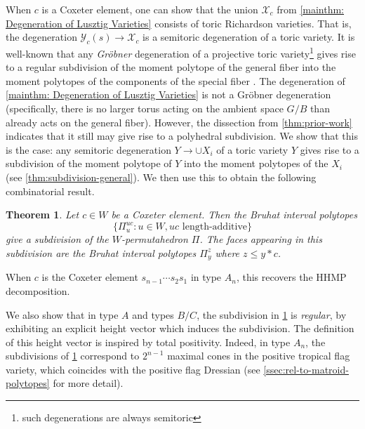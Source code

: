 \documentclass[11pt]{amsart}
\newtheorem{mainthm}{Theorem}
\theoremstyle{definition}
\def\calX{\mathcal{X}}
\newcommand\calY{{\mathcal Y}}
\begin{document}
When $c$ is a Coxeter element, one can show that the union $\calX_c$
from \cref{mainthm: Degeneration of Lusztig Varieties} consists of
toric Richardson varieties. That is, the degeneration
$\calY_c(s) \to \calX_c$ is a semitoric degeneration of a toric
variety. It is well-known that any \emph{Gr\"obner} degeneration of a
projective toric
variety\footnote{such degenerations are always semitoric} gives rise to a
regular subdivision of the moment polytope of the general fiber into
the moment polytopes of the components of the special fiber
\cite{sturmfels1991grobner,zhu2012degenerations}. 
The degeneration of \cref{mainthm: Degeneration of Lusztig Varieties} is
not a Gr\"obner degeneration (specifically, there is no larger torus
acting on the ambient space $G/B$ than already acts on the general
fiber). However, the dissection from \cref{thm:prior-work} indicates
that it still may give rise to a polyhedral subdivision. We show that
this is the case: any semitoric degeneration $Y \to \cup X_i$ of a
toric variety $Y$ gives rise to a subdivision of the moment polytope
of $Y$ into the moment polytopes of the $X_i$ (see
\cref{thm:subdivision-general}). We then use this to obtain the
following combinatorial result.

\begin{mainthm}\label{mainthm: Permutahedron Subdivisions}
    Let $c \in W$ be a Coxeter element. Then the Bruhat interval polytopes
    \[\{\Pi_u^{uc}: u \in W, uc\text{ length-additive}\}\]
    give a subdivision of the $W$-permutahedron $\Pi$. The faces appearing in this subdivision are the Bruhat interval polytopes $\Pi_y^z$ where $z \leq y * c$.
\end{mainthm}
When $c$ is the Coxeter element $s_{n-1} \cdots s_2s_1$ in type $A_n$,
this recovers the HHMP decomposition.

We also show that in type $A$ and types $B/C$, the subdivision in \cref{mainthm: Permutahedron Subdivisions} is \emph{regular}, by exhibiting an explicit height vector which induces the subdivision. The definition of this height vector is inspired by total positivity. Indeed, in type $A_n$, the subdivisions of \cref{mainthm: Permutahedron Subdivisions} correspond to $2^{n-1}$ maximal cones in the positive tropical flag variety, which coincides with the positive flag Dressian (see \cref{ssec:rel-to-matroid-polytopes} for more detail).
\end{document}
